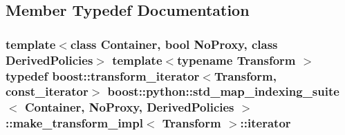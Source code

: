 \subsection{Member Typedef Documentation}
\hypertarget{structboost_1_1python_1_1std__map__indexing__suite_1_1make__transform__impl_a64d7b60f0e792533c1cc89b84f341b0d}{
\subsubsection[{iterator}]{\setlength{\rightskip}{0pt plus 5cm}template$<$class Container, bool No\-Proxy, class Derived\-Policies$>$ template$<$typename Transform $>$ typedef boost\-::transform\-\_\-iterator$<$Transform, {\bf const\-\_\-iterator}$>$ {\bf boost\-::python\-::std\-\_\-map\-\_\-indexing\-\_\-suite}$<$ Container, No\-Proxy, Derived\-Policies $>$\-::{\bf make\-\_\-transform\-\_\-impl}$<$ Transform $>$\-::{\bf iterator}}}\label{structboost_1_1python_1_1std__map__indexing__suite_1_1make__transform__impl_a64d7b60f0e792533c1cc89b84f341b0d}


